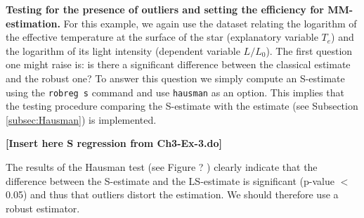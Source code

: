 \begin{stexample}
\textbf{Testing for the presence of outliers and setting the efficiency for
MM-estimation. }For this example, we again use the dataset relating the
logarithm of the effective temperature at the surface of the star (explanatory
variable $T_{e}$) and the logarithm of its light intensity (dependent variable
$L/L_{0}$). The first question one might raise is: is there a significant
difference between the classical estimate and the robust one? To answer this
question we simply compute an S-estimate using the
\texttt{robreg s}%
command and use
\texttt{hausman}%
as an option. This implies that the testing procedure comparing the S-estimate
with the  estimate (see Subsection \ref{subsec:Hausman}) is implemented.

\textbf{[Insert here S regression from Ch3-Ex-3.do]} \ \newline

The results of the Hausman test (see Figure ?%
)
clearly indicate that the difference between the S-estimate and the
LS-estimate is significant (p-value%
$<$%
0.05) and thus that outliers distort the  estimation. We should therefore
use a robust estimator.


\end{stexample}

